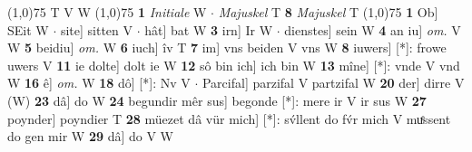 \documentclass[8pt,a4paper,notitlepage]{article}
\begin{document}
\begin{table}[ht]
\begin{minipage}[t]{0.5\linewidth}
\begin{tabular}{rl}
\end{tabular}
\scriptsize
\line(1,0){75} \newline
T V W \newline
\line(1,0){75} \newline
\textbf{1} \textit{Initiale} W   $\cdot$ \textit{Majuskel} T  \textbf{8} \textit{Majuskel} T  \newline
\line(1,0){75} \newline
\textbf{1} Ob] SEit W  $\cdot$ site] sitten V  $\cdot$ hât] bat W \textbf{3} irn] Ir W  $\cdot$ dienstes] sein W \textbf{4} an iu] \textit{om.} V W \textbf{5} beidiu] \textit{om.} W \textbf{6} iuch] îv T \textbf{7} im] vns beiden V vns W \textbf{8} iuwers] [*]: frowe uwers V \textbf{11} ie dolte] dolt ie W \textbf{12} sô bin ich] ich bin W \textbf{13} mîne] [*]: vnde V vnd W \textbf{16} ê] \textit{om.} W \textbf{18} dô] [*]: Nv V  $\cdot$ Parcifal] parzifal V partzifal W \textbf{20} der] dirre V (W) \textbf{23} dâ] do W \textbf{24} begundir mêr sus] begonde [*]: mere ir V ir sus W \textbf{27} poynder] poyndier T \textbf{28} müezet dâ vür mich] [*]: sv́llent do fv́r mich V muͤssent do gen mir W \textbf{29} dâ] do V W \newline
\end{minipage}
\end{table}
\end{document}
